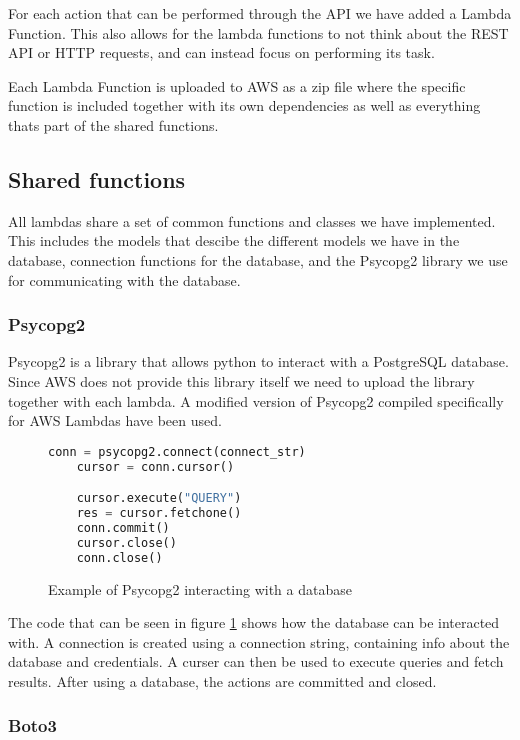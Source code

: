 For each action that can be performed through the API we have added a Lambda Function. This also allows for the lambda functions to not think about the REST API or HTTP requests, and can instead focus on performing its task.

Each Lambda Function is uploaded to AWS as a zip file where the specific function is included together with its own dependencies as well as everything thats part of the shared functions.

\subsection{Shared functions}

All lambdas share a set of common functions and classes we have implemented. This includes the models that descibe the different models we have in the database, connection functions for the database, and the Psycopg2 library we use for communicating with the database.

\subsubsection{Psycopg2}
Psycopg2 is a library that allows python to interact with a PostgreSQL database. Since AWS does not provide this library itself we need to upload the library together with each lambda. A modified version of Psycopg2 compiled specifically for AWS Lambdas have been used.

\begin{figure}[H]
    \centering
    \begin{lstlisting}[language=Python]
    conn = psycopg2.connect(connect_str)
    cursor = conn.cursor()

    cursor.execute("QUERY")
    res = cursor.fetchone()
    conn.commit()
    cursor.close()
    conn.close()
\end{lstlisting}
    \caption{Example of Psycopg2 interacting with a database}
    \label{fig:psycopg2example}
\end{figure}

The code that can be seen in figure \ref{fig:psycopg2example} shows how the database can be interacted with. A connection is created using a connection string, containing info about the database and credentials. A curser can then be used to execute queries and fetch results. After using a database, the actions are committed and closed.


\subsubsection{Boto3}    

